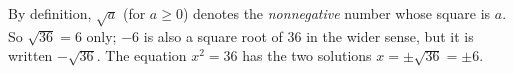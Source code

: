 By definition, $\sqrt a$ (for $a\ge0$) denotes the \emph{nonnegative} number whose square is $a$. So $\sqrt{36}=6$ only; $-6$ is also a square root of $36$ in the wider sense, but it is written $-\sqrt{36}$. The equation $x^2=36$ has the two solutions $x=\pm\sqrt{36}=\boxed{\pm6}$.
